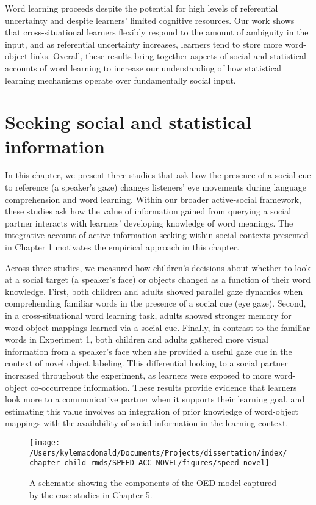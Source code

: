 \documentclass[oneside]{report}
\begin{document}
Word learning proceeds despite the potential for high levels of
referential uncertainty and despite learners' limited cognitive
resources. Our work shows that cross-situational learners flexibly
respond to the amount of ambiguity in the input, and as referential
uncertainty increases, learners tend to store more word-object links.
Overall, these results bring together aspects of social and statistical
accounts of word learning to increase our understanding of how
statistical learning mechanisms operate over fundamentally social input.

\chapter{Seeking social and statistical
information}\label{seeking-social-and-statistical-information}

In this chapter, we present three studies that ask how the presence of a
social cue to reference (a speaker's gaze) changes listeners' eye
movements during language comprehension and word learning. Within our
broader active-social framework, these studies ask how the value of
information gained from querying a social partner interacts with
learners' developing knowledge of word meanings. The integrative account
of active information seeking within social contexts presented in
Chapter 1 motivates the empirical approach in this chapter.

Across three studies, we measured how children's decisions about whether
to look at a social target (a speaker's face) or objects changed as a
function of their word knowledge. First, both children and adults showed
parallel gaze dynamics when comprehending familiar words in the presence
of a social cue (eye gaze). Second, in a cross-situational word learning
task, adults showed stronger memory for word-object mappings learned via
a social cue. Finally, in contrast to the familiar words in Experiment
1, both children and adults gathered more visual information from a
speaker's face when she provided a useful gaze cue in the context of
novel object labeling. This differential looking to a social partner
increased throughout the experiment, as learners were exposed to more
word-object co-occurrence information. These results provide evidence
that learners look more to a communicative partner when it supports
their learning goal, and estimating this value involves an integration
of prior knowledge of word-object mappings with the availability of
social information in the learning context.
\begin{figure}[!t]

{\centering \texttt{[image: /Users/kylemacdonald/Documents/Projects/dissertation/index/chapter\_child\_rmds/SPEED-ACC-NOVEL/figures/speed\_novel]} 

}

\caption[Overview of Chapter 5.]{A schematic showing the components of the OED model captured by the case studies in Chapter 5.}\label{fig:schematic-speed-novel}
\end{figure}
\end{document}
